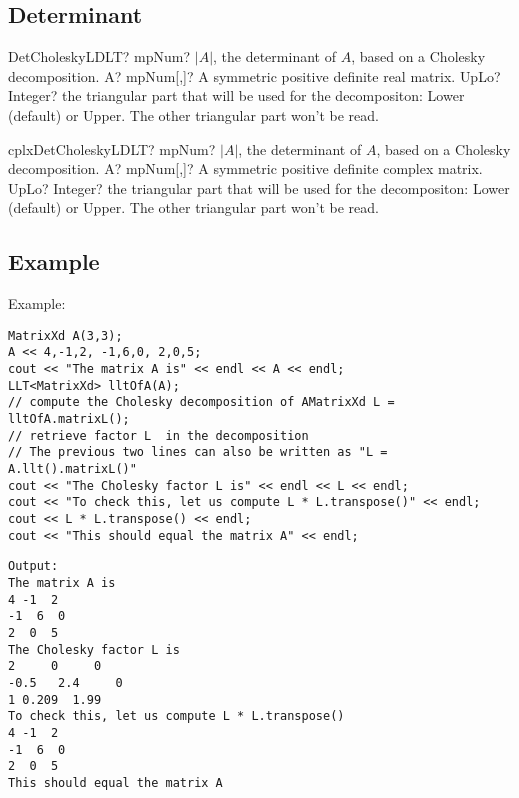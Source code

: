 \subsection{Determinant}

\begin{mpFunctionsExtract}
	\mpFunctionTwo
	{DetCholeskyLDLT? mpNum? $|A|$, the determinant of $A$, based on a Cholesky decomposition.}
	{A? mpNum[,]? A symmetric positive definite real matrix.}
	{UpLo? Integer? the triangular part that will be used for the decompositon: Lower (default) or Upper. The other triangular part won't be read.}
\end{mpFunctionsExtract}

\vspace{0.6cm}
\begin{mpFunctionsExtract}
	\mpFunctionTwo
	{cplxDetCholeskyLDLT? mpNum? $|A|$, the determinant of $A$, based on a Cholesky decomposition.}
	{A? mpNum[,]? A symmetric positive definite complex matrix.}
	{UpLo? Integer? the triangular part that will be used for the decompositon: Lower (default) or Upper. The other triangular part won't be read.}
\end{mpFunctionsExtract}




\subsection{Example}
Example:

\begin{lstlisting}
MatrixXd A(3,3);
A << 4,-1,2, -1,6,0, 2,0,5;
cout << "The matrix A is" << endl << A << endl;
LLT<MatrixXd> lltOfA(A);
// compute the Cholesky decomposition of AMatrixXd L = lltOfA.matrixL();
// retrieve factor L  in the decomposition
// The previous two lines can also be written as "L = A.llt().matrixL()"
cout << "The Cholesky factor L is" << endl << L << endl;
cout << "To check this, let us compute L * L.transpose()" << endl;
cout << L * L.transpose() << endl;
cout << "This should equal the matrix A" << endl;
\end{lstlisting}

\begin{verbatim}
Output:
The matrix A is
4 -1  2
-1  6  0
2  0  5
The Cholesky factor L is
2     0     0
-0.5   2.4     0
1 0.209  1.99
To check this, let us compute L * L.transpose()
4 -1  2
-1  6  0
2  0  5
This should equal the matrix A
\end{verbatim}



